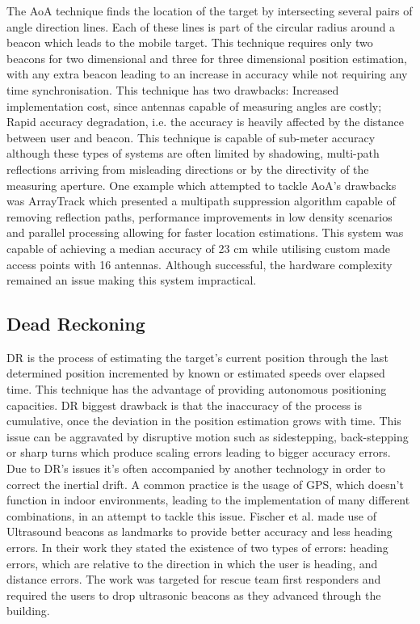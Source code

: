  
The \ac{AoA} technique finds the location of the target by intersecting several pairs of angle direction lines. Each of these lines is part of the circular radius around a beacon which leads to the mobile target. This technique requires only two beacons for two dimensional and three for three dimensional position estimation, with any extra beacon leading to an increase in accuracy while not requiring any time synchronisation\cite{anglearrival}.  
This technique has two drawbacks: Increased implementation cost, since antennas capable of measuring angles are costly; Rapid accuracy degradation, i.e. the accuracy is heavily affected by the distance between user and beacon. This technique is capable of sub-meter accuracy although these types of systems are often limited by shadowing, multi-path reflections arriving from misleading directions or by the directivity of the measuring aperture.  
One example which attempted to tackle \ac{AoA}'s drawbacks was ArrayTrack \cite{arraytrack} which presented a multipath suppression algorithm capable of removing reflection paths, performance improvements in low density scenarios and parallel processing allowing for faster location estimations. This system was capable of achieving a median accuracy of 23 cm while utilising custom made access points with 16 antennas. Although successful, the hardware complexity remained an issue making this system impractical. 
 
 
\subsection{Dead Reckoning} 
\label{subsec:dr} 
 
 
\ac{DR} is the process of estimating the target's current position through the last determined position incremented by known or estimated speeds over elapsed time. This technique has the advantage of providing autonomous positioning capacities. \ac{DR} biggest drawback is that the inaccuracy of the process is cumulative, once the deviation in the position estimation grows with time. This issue can be aggravated by disruptive motion such as sidestepping, back-stepping or sharp turns which produce scaling errors leading to bigger accuracy errors. Due to \ac{DR}'s issues it's often accompanied by another technology in order to correct the inertial drift. A common practice is the usage of GPS, which doesn't function in indoor environments, leading to the implementation of many different combinations, in an attempt to tackle this issue. Fischer et al. \cite{dr1} made use of Ultrasound beacons as landmarks to provide better accuracy and less heading errors. In their work they stated the existence of two types of errors: heading errors, which are relative to the direction in which the user is heading, and distance errors. The work was targeted for rescue team first responders and required the users to drop ultrasonic beacons as they advanced through the building. 